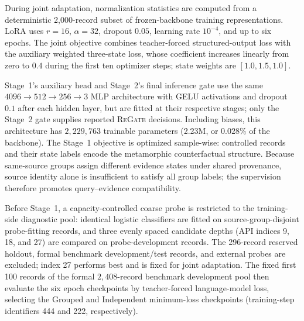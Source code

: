 \documentclass[letterpaper]{article}
\newcommand{\Method}{\textsc{ReGate}\xspace}
\begin{document}
During joint adaptation, normalization statistics are computed from a deterministic 2,000-record subset of frozen-backbone training representations. LoRA uses $r=16$, $\alpha=32$, dropout $0.05$, learning rate $10^{-4}$, and up to six epochs. The joint objective combines teacher-forced structured-output loss with the auxiliary weighted three-state loss, whose coefficient increases linearly from zero to $0.4$ during the first ten optimizer steps; state weights are $[1.0,1.5,1.0]$.

Stage~1's auxiliary head and Stage~2's final inference gate use the same $4096\!\rightarrow\!512\!\rightarrow\!256\!\rightarrow\!3$ MLP architecture with GELU activations and dropout $0.1$ after each hidden layer, but are fitted at their respective stages; only the Stage~2 gate supplies reported \Method decisions. Including biases, this architecture has $2{,}229{,}763$ trainable parameters (2.23M, or $0.028\%$ of the backbone). The Stage~1 objective is optimized sample-wise: controlled records and their state labels encode the metamorphic counterfactual structure. Because same-source groups assign different evidence states under shared provenance, source identity alone is insufficient to satisfy all group labels; the supervision therefore promotes query--evidence compatibility.

Before Stage~1, a capacity-controlled coarse probe is restricted to the training-side diagnostic pool: identical logistic classifiers are fitted on source-group-disjoint probe-fitting records, and three evenly spaced candidate depths (API indices 9, 18, and 27) are compared on probe-development records. The 296-record reserved holdout, formal benchmark development/test records, and external probes are excluded; index 27 performs best and is fixed for joint adaptation. The fixed first 100 records of the formal $2{,}408$-record benchmark development pool then evaluate the six epoch checkpoints by teacher-forced language-model loss, selecting the Grouped and Independent minimum-loss checkpoints (training-step identifiers 444 and 222, respectively).
\end{document}

